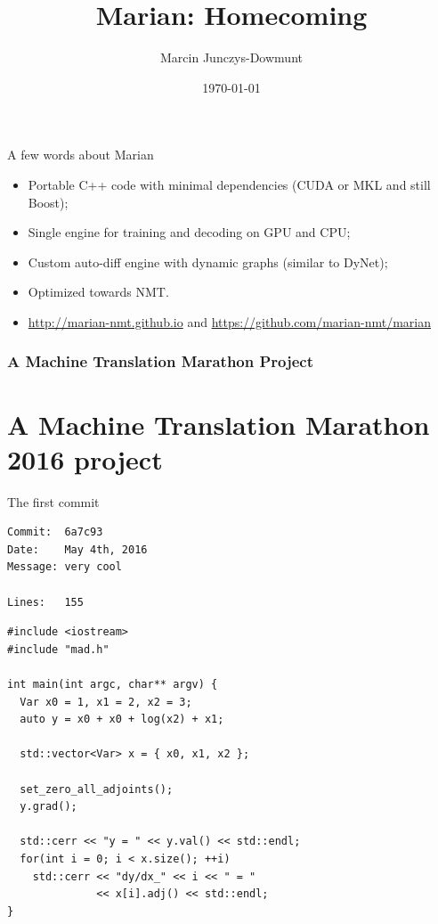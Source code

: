 \documentclass[aspectratio=169]{beamer}					%
\title{Marian: Homecoming}	%
\author{Marcin Junczys-Dowmunt}								%
\institute{Name of institution}					%
\date{\today}									%
\begin{document}

{

}

\begin{frame}{A few words about Marian}
\begin{itemize}
 \item Portable C++ code with minimal dependencies (CUDA or MKL and still Boost);
 \item Single engine for training and decoding on GPU and CPU;
 \item Custom auto-diff engine with dynamic graphs (similar to DyNet);
 \item Optimized towards NMT.
 \item \url{http://marian-nmt.github.io} and \url{https://github.com/marian-nmt/marian}
\end{itemize}
\end{frame}

\section{A Machine Translation Marathon Project}

\part{A Machine Translation Marathon 2016 project}
\frame{\partpage}

\begin{frame}[fragile]{The first commit}

\begin{verbatim}
Commit:  6a7c93 
Date:    May 4th, 2016
Message: very cool

Lines:   155
\end{verbatim}

\end{frame}

\begin{frame}[fragile]
\begin{lstlisting}
#include <iostream>
#include "mad.h"

int main(int argc, char** argv) {
  Var x0 = 1, x1 = 2, x2 = 3;
  auto y = x0 + x0 + log(x2) + x1;
  
  std::vector<Var> x = { x0, x1, x2 };
        
  set_zero_all_adjoints();
  y.grad();
        
  std::cerr << "y = " << y.val() << std::endl;
  for(int i = 0; i < x.size(); ++i)
    std::cerr << "dy/dx_" << i << " = " 
              << x[i].adj() << std::endl;
}
\end{lstlisting}
\end{frame}
\end{document}
